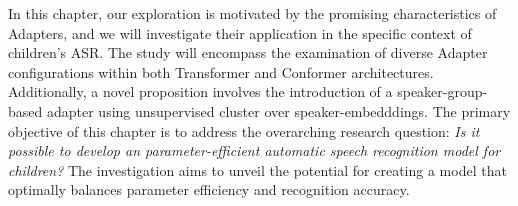  In this chapter, our exploration is motivated by the promising characteristics of Adapters, and we will investigate their application in the specific context of children's ASR. The study will encompass the examination of diverse Adapter configurations within both Transformer and Conformer architectures. Additionally, a novel proposition involves the introduction of a speaker-group-based adapter using unsupervised cluster over speaker-embedddings.
The primary objective of this chapter is to address the overarching research question: \textit{Is it possible to develop an parameter-efficient automatic speech recognition model for children?} The investigation aims to unveil the potential for creating a model that optimally balances parameter efficiency and recognition accuracy. 





